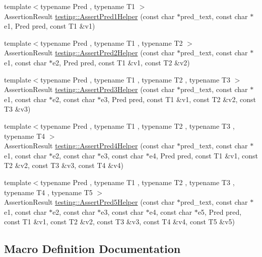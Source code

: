 \begin{DoxyCompactItemize}
\item 
{\footnotesize template$<$typename Pred , typename T1 $>$ }\\Assertion\+Result \mbox{\hyperlink{namespacetesting_a7f73180474723be6e92185d6fa9e7c9f}{testing\+::\+Assert\+Pred1\+Helper}} (const char $\ast$pred\+\_\+text, const char $\ast$e1, Pred pred, const T1 \&v1)
\item 
{\footnotesize template$<$typename Pred , typename T1 , typename T2 $>$ }\\Assertion\+Result \mbox{\hyperlink{namespacetesting_aa6587938029dd8733ecb885068f08247}{testing\+::\+Assert\+Pred2\+Helper}} (const char $\ast$pred\+\_\+text, const char $\ast$e1, const char $\ast$e2, Pred pred, const T1 \&v1, const T2 \&v2)
\item 
{\footnotesize template$<$typename Pred , typename T1 , typename T2 , typename T3 $>$ }\\Assertion\+Result \mbox{\hyperlink{namespacetesting_ac92dcbd00a0ffb2913e65d286e321a22}{testing\+::\+Assert\+Pred3\+Helper}} (const char $\ast$pred\+\_\+text, const char $\ast$e1, const char $\ast$e2, const char $\ast$e3, Pred pred, const T1 \&v1, const T2 \&v2, const T3 \&v3)
\item 
{\footnotesize template$<$typename Pred , typename T1 , typename T2 , typename T3 , typename T4 $>$ }\\Assertion\+Result \mbox{\hyperlink{namespacetesting_ae90c778d69db4682e8fd8baaa0a9f9cd}{testing\+::\+Assert\+Pred4\+Helper}} (const char $\ast$pred\+\_\+text, const char $\ast$e1, const char $\ast$e2, const char $\ast$e3, const char $\ast$e4, Pred pred, const T1 \&v1, const T2 \&v2, const T3 \&v3, const T4 \&v4)
\item 
{\footnotesize template$<$typename Pred , typename T1 , typename T2 , typename T3 , typename T4 , typename T5 $>$ }\\Assertion\+Result \mbox{\hyperlink{namespacetesting_addcf52b273ce17269cbf4956cfe600a6}{testing\+::\+Assert\+Pred5\+Helper}} (const char $\ast$pred\+\_\+text, const char $\ast$e1, const char $\ast$e2, const char $\ast$e3, const char $\ast$e4, const char $\ast$e5, Pred pred, const T1 \&v1, const T2 \&v2, const T3 \&v3, const T4 \&v4, const T5 \&v5)
\end{DoxyCompactItemize}


\subsection{Macro Definition Documentation}
\mbox{\label{_obj__test_2lib_2googletest-master_2googletest_2include_2gtest_2gtest__pred__impl_8h_a7d72f779b7d39b8f73a563ebc6d0604b}} 
